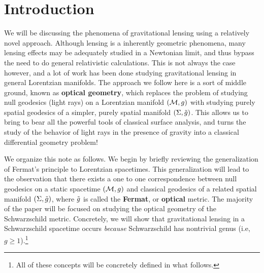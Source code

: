 
\section{Introduction}
We will be discussing the phenomena of gravitational lensing using a relatively novel approach.
Although lensing is a inherently geometric phenomena, many lensing effects may be adequately studied in a Newtonian limit, and thus bypass the need to do general relativistic calculations.
This is not always the case however, and a lot of work has been done studying gravitational lensing in general Lorentzian manifolds.
The approach we follow here is a sort of middle ground, known as \textbf{optical geometry}, which replaces the problem of studying null geodesics (light rays) on a Lorentzian manifold $(\mathcal{M}, g)$ with studying purely spatial geodesics of a simpler, purely spatial manifold $(\Sigma, \tilde{g})$.
This allows us to bring to bear all the powerful tools of classical surface analysis, and turns the study of the behavior of light rays in the presence of gravity into a classical differential geometry problem!

We organize this note as follows.
We begin by briefly reviewing the generalization of Fermat's principle to Lorentzian spacetimes.
This generalization will lead to the observation that there exists a one to one correspondence between null geodesics on a static spacetime $(\mathcal{M}, g)$ and classical geodesics of a related spatial manifold $(\Sigma, \tilde{g})$, where $\tilde{g}$ is called the \textbf{Fermat}, or \textbf{optical} metric.
The majority of the paper will be focused on studying the optical geometry of the Schwarzschild metric.
Concretely, we will show that gravitational lensing in a Schwarzschild spacetime occurs \textit{because} Schwarzschild has nontrivial genus (i.e, $g \ge 1$).\footnote{All of these concepts will be concretely defined in what follows.}


